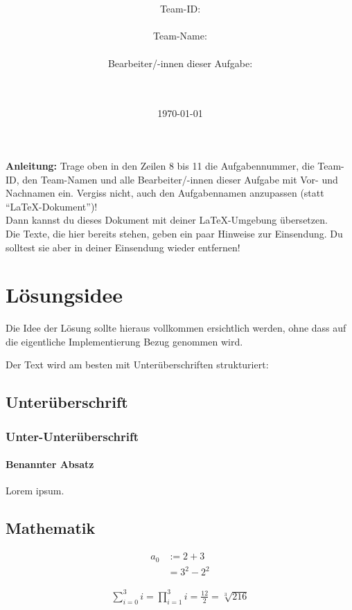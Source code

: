 \documentclass[a4paper,10pt,ngerman]{scrartcl}
\title{\textbf{\Huge\Aufgabe}}
\author{\LARGE Team-ID: \LARGE \TeamID \\\\
	    \LARGE Team-Name: \LARGE \TeamName \\\\
	    \LARGE Bearbeiter/-innen dieser Aufgabe: \\ 
	    \LARGE \Namen\\\\}
\date{\LARGE\today}
\begin{document}
\maketitle
\tableofcontents

\vspace{0.5cm}

\noindent\textbf{Anleitung:} Trage oben in den Zeilen 8 bis 11 die Aufgabennummer, 
die Team-ID, den Team-Namen und alle Bearbeiter/-innen dieser Aufgabe mit Vor- und Nachnamen ein.
Vergiss nicht, auch den Aufgabennamen anzupassen (statt "`\LaTeX-Dokument"')!\\
   
\noindent Dann kannst du dieses Dokument mit deiner \LaTeX-Umgebung übersetzen.\\

\noindent Die Texte, die hier bereits stehen, geben ein paar Hinweise zur
Einsendung. Du solltest sie aber in deiner Einsendung wieder entfernen!

\section{Lösungsidee}
Die Idee der Lösung sollte hieraus vollkommen ersichtlich werden, ohne dass auf die eigentliche Implementierung Bezug genommen wird.

Der Text wird am besten mit Unterüberschriften strukturiert:
\subsection{Unterüberschrift}
\subsubsection{Unter-Unterüberschrift}
\paragraph{Benannter Absatz} Lorem ipsum.


\subsection{Mathematik}

\begin{align}
 a_0 & := 2 + 3 \\
   & = 3^2 - 2^2
\end{align}

\begin{align}\label{eq:toll}
 \sum_{i=0}^3 i = \prod_{i=1}^3 i = \frac{12}{2} = \sqrt[3]{216}
\end{align}
\end{document}
